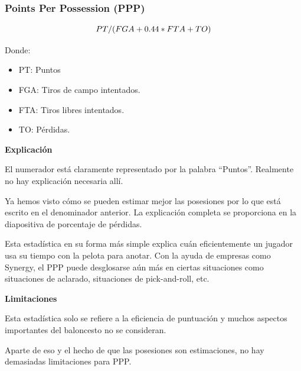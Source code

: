\documentclass[
]{article}
\newenvironment{Shaded}{\begin{snugshade}}{\end{snugshade}}
\newcommand{\DecValTok}[1]{\textcolor[rgb]{0.00,0.00,0.81}{#1}}
\newcommand{\FloatTok}[1]{\textcolor[rgb]{0.00,0.00,0.81}{#1}}
\newcommand{\KeywordTok}[1]{\textcolor[rgb]{0.13,0.29,0.53}{\textbf{#1}}}
\newcommand{\NormalTok}[1]{#1}
\newcommand{\OperatorTok}[1]{\textcolor[rgb]{0.81,0.36,0.00}{\textbf{#1}}}
\newcommand{\StringTok}[1]{\textcolor[rgb]{0.31,0.60,0.02}{#1}}
\providecommand{\tightlist}{%
  \setlength{\itemsep}{0pt}\setlength{\parskip}{0pt}}
\begin{document}
\hypertarget{points-per-possession-ppp}{%
\subsubsection{Points Per Possession
(PPP)}\label{points-per-possession-ppp}}

\[
  \makebox[\linewidth]{$PT/(FGA+0.44*FTA+TO)$}
\]

Donde:

\begin{itemize}
\tightlist
\item
  PT: Puntos
\item
  FGA: Tiros de campo intentados.
\item
  FTA: Tiros libres intentados.
\item
  TO: Pérdidas.
\end{itemize}

\textbf{Explicación}

El numerador está claramente representado por la palabra ``Puntos''.
Realmente no hay explicación necesaria allí.

Ya hemos visto cómo se pueden estimar mejor las posesiones por lo que
está escrito en el denominador anterior. La explicación completa se
proporciona en la diapositiva de porcentaje de pérdidas.

Esta estadística en su forma más simple explica cuán eficientemente un
jugador usa su tiempo con la pelota para anotar. Con la ayuda de
empresas como Synergy, el PPP puede desglosarse aún más en ciertas
situaciones como situaciones de aclarado, situaciones de pick-and-roll,
etc.

\textbf{Limitaciones}

Esta estadística solo se refiere a la eficiencia de puntuación y muchos
aspectos importantes del baloncesto no se consideran.

Aparte de eso y el hecho de que las posesiones son estimaciones, no hay
demasiadas limitaciones para PPP.

\begin{Shaded}
\end{Shaded}
\end{document}
